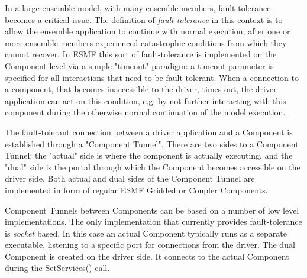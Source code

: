 %

\label{sec:CompTunnel}

In a large ensemble model, with many ensemble members, fault-tolerance becomes a critical issue. The definition of {\em fault-tolerance} in this context is to allow the ensemble application to continue with normal execution, after one or more ensemble members experienced catastrophic conditions from which they cannot recover. In ESMF this sort of fault-tolerance is implemented on the Component level via a simple "timeout" paradigm: a timeout parameter is specified for all interactions that need to be fault-tolerant. When a connection to a component, that becomes inaccessible to the driver, times out, the driver application can act on this condition, e.g. by not further interacting with this component during the otherwise normal continuation of the model execution.

The fault-tolerant connection between a driver application and a Component is established through a "Component Tunnel". There are two sides to a Component Tunnel: the "actual" side is where the component is actually executing, and the "dual" side is the portal through which the Component becomes accessible on the driver side. Both actual and dual sides of the Component Tunnel are implemented in form of regular ESMF Gridded or Coupler Components.

Component Tunnels between Components can be based on a number of low level implementations. The only implementation that currently provides fault-tolerance is {\em socket} based. In this case an actual Component typically runs as a separate executable, listening to a specific port for connections from the driver. The dual Component is created on the driver side. It connects to the actual Component during the SetServices() call.

